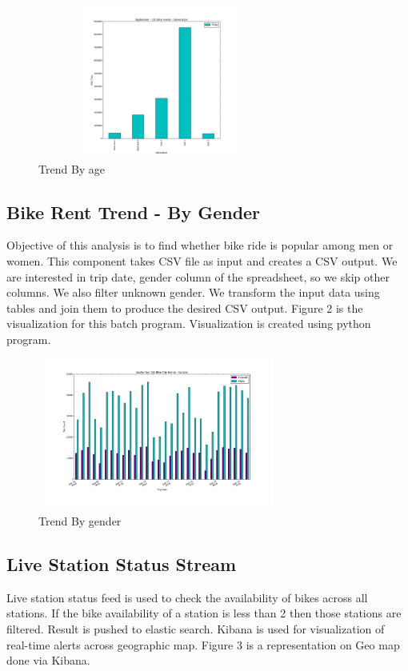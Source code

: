 \documentclass{sig-alternate-05-2015}
\begin{document}
\begin{figure}[!ht]
\includegraphics[width=8cm, height=5cm]{tripsbygeneration}
 \caption{Trend By age}\label{F:small}
\end{figure}

\break
\subsection {Bike Rent Trend - By Gender}
Objective of this analysis is to find whether bike ride is popular among men or women. This component takes CSV file as input and creates a CSV output. We are interested in trip date, gender column of the spreadsheet, so we skip other columns. We also filter unknown gender. We transform the input data using tables
and join them to produce the desired CSV output. Figure 2 is the visualization for this batch program. Visualization is created using python program.

\begin{figure}[!ht]
\includegraphics[width=8cm, height=5cm]{tripsbygender}
 \caption{Trend By gender}\label{F:small}
\end{figure}
\subsection {Live Station Status Stream}
Live station status feed is used to check the availability of bikes across all stations. If the bike availability of a station is less than 2 then those stations are filtered. Result is pushed to elastic search. Kibana is used for visualization of real-time alerts across geographic map. Figure 3 is a representation on Geo map done via Kibana.
\end{document}
